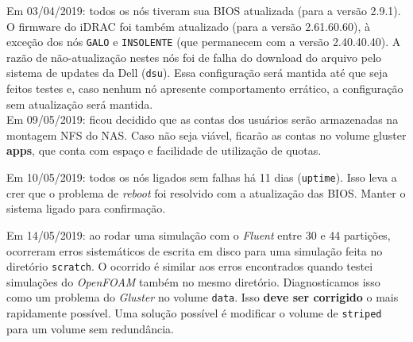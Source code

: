 Em 03/04/2019: todos os nós tiveram sua BIOS atualizada (para a versão 2.9.1). O firmware do iDRAC foi também atualizado (para a versão 2.61.60.60), à exceção dos nós \texttt{GALO} e \texttt{INSOLENTE} (que permanecem com a versão 2.40.40.40). A razão de não-atualização nestes nós foi de falha do download do arquivo pelo sistema de updates da Dell (\texttt{dsu}). Essa configuração será mantida 
até que seja feitos testes e, caso nenhum nó apresente comportamento errático, 
a configuração sem atualização será mantida.\\


Em 09/05/2019: ficou decidido que as contas dos usuários serão armazenadas na 
montagem NFS do NAS. Caso não seja viável, ficarão as contas no volume gluster 
\textbf{apps}, que conta com espaço e facilidade de utilização de quotas.

Em 10/05/2019: todos os nós ligados sem falhas há 11 dias (\texttt{uptime}).
Isso leva a crer que o problema de \textit{reboot} foi resolvido com a
atualização das BIOS. Manter o sistema ligado para confirmação.

Em 14/05/2019: ao rodar uma simulação com o \textit{Fluent} entre 30 e 44 partições, ocorreram erros sistemáticos de escrita em disco para uma simulação 
feita no diretório \texttt{scratch}. O ocorrido é similar aos erros encontrados 
quando testei simulações do \textit{OpenFOAM} também no mesmo diretório. 
Diagnosticamos isso como um problema do \textit{Gluster} no volume \texttt{data}.
Isso \textbf{deve ser corrigido} o mais rapidamente possível. Uma solução possível 
é modificar o volume de \texttt{striped} para um volume sem redundância.



